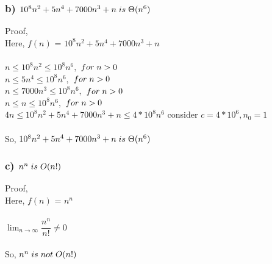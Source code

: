 \documentclass[10pt, a4paper]{article}
\begin{document}
	\subsubsection*{b)
	$10^8n^2+5n^4+7000n^3+n\hspace{0.1cm} is\hspace{0.1cm} \Theta(n^6)$}
	{Proof,\\}
	Here, {$f(n)$} = {$10^8n^2+5n^4+7000n^3+n$} \\\\
	{$ n \leq 10^8n^2 \leq 10^8n^6 , $ \hspace{.5cm}$ for\hspace{0.1cm}n>0$\\}
	{$ n \leq 5n^4 \leq 10^8n^6, $ \hspace{.5cm}$ for\hspace{0.1cm}n>0$\\}
	{$ n \leq 7000n^3 \leq 10^8n^6, $ \hspace{.5cm}$ for\hspace{0.1cm}n>0$\\}
	{$ n \leq n \leq 10^8n^6, $ \hspace{.5cm}$ for\hspace{0.1cm}n>0$\\}
	{$4n \leq 10^8n^2+5n^4+7000n^3+n  \leq 4*10^8n^6$ \rightarrow consider \hspace{.1cm} $c=4 * 10^6, n_0=1$ \\ \\}
	{So,\hspace{0.1cm} $10^8n^2+5n^4+7000n^3+n\hspace{0.1cm} is\hspace{0.1cm} \Theta(n^6)$}
	
	\subsubsection*{c) $n^n\hspace{.1cm}is\hspace{.1cm}O(n!)$}
	{Proof,\\}
	Here, {$f(n)$} = {$n^n$} \\\\
	{$\lim_{n\to\infty}\dfrac{n^n}{n!} \neq 0$\\\\}
	{So,\hspace{0.1cm} $n^n\hspace{0.1cm} is\hspace{0.1cm}not\hspace{0.1cm} O(n!)$}
	
\end{document}
